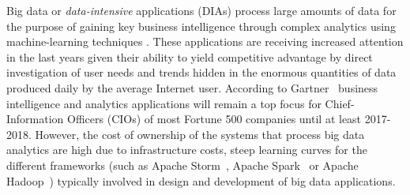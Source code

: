 
Big data or \emph{data-intensive} applications (DIAs) process large amounts of data for the purpose of gaining key business intelligence through complex analytics using machine-learning techniques \cite{bdsurvey, ml4bd}. These applications are receiving increased attention in the last years given their ability to yield competitive advantage by direct investigation of user needs and trends hidden in the enormous quantities of data produced daily by the average Internet user. According to Gartner~\cite{gartner} %
business intelligence and analytics applications will remain a top focus for Chief-Information Officers (CIOs) of most Fortune 500 companies until at least 2017-2018.
However, the cost of ownership of the systems that process big data analytics are high due to infrastructure costs, steep learning curves for the different frameworks (such as Apache Storm~\cite{storm},
Apache Spark~\cite{spark}
or Apache Hadoop~\cite{hadoop}) typically involved in design and development of big data applications.

